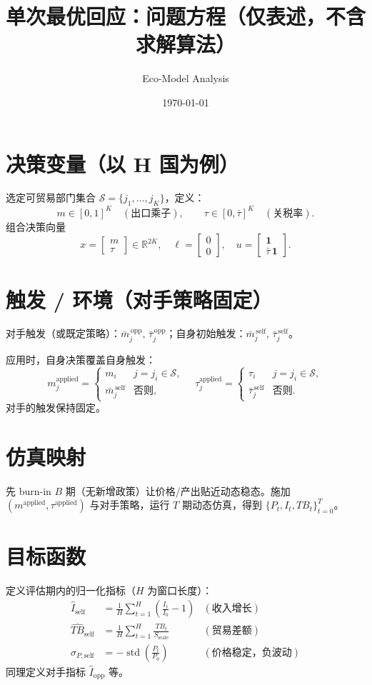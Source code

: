 \documentclass{ctexart}
\title{单次最优回应：问题方程（仅表述，不含求解算法）}
\author{Eco-Model Analysis}
\date{\today}
\begin{document}
\maketitle

\section*{决策变量（以 H 国为例）}
选定可贸易部门集合 $\mathcal{S}=\{j_1,\dots,j_K\}$，定义：
\[
m \in [0,1]^K \quad (\text{出口乘子}), \qquad
\tau \in [0,\bar{\tau}]^K \quad (\text{关税率}).
\]
组合决策向量
\[
x = \begin{bmatrix} m \\ \tau \end{bmatrix} \in \mathbb{R}^{2K},\quad
\ell = \begin{bmatrix} 0 \\ 0 \end{bmatrix},\quad
u = \begin{bmatrix} \mathbf{1} \\ \bar{\tau}\,\mathbf{1} \end{bmatrix}.
\]

\section*{触发 / 环境（对手策略固定）}
对手触发（或既定策略）：$\bar{m}^{\,\text{opp}}_j,\,\bar{\tau}^{\,\text{opp}}_j$；自身初始触发：$\bar{m}^{\,\text{self}}_j,\,\bar{\tau}^{\,\text{self}}_j$。

应用时，自身决策覆盖自身触发：
\[
m^{\text{applied}}_j =
\begin{cases}
m_i & j=j_i\in\mathcal{S},\\
\bar{m}^{\,\text{self}}_j & \text{否则},
\end{cases}
\quad
\tau^{\text{applied}}_j =
\begin{cases}
\tau_i & j=j_i\in\mathcal{S},\\
\bar{\tau}^{\,\text{self}}_j & \text{否则}.
\end{cases}
\]
对手的触发保持固定。

\section*{仿真映射}
先 burn-in $B$ 期（无新增政策）让价格/产出贴近动态稳态。施加 $(m^{\text{applied}}, \tau^{\text{applied}})$ 与对手策略，运行 $T$ 期动态仿真，得到 $\{P_t, I_t, TB_t\}_{t=0}^{T}$。

\section*{目标函数}
定义评估期内的归一化指标（$H$ 为窗口长度）：
\begin{align*}
    \hat{I}_{\text{self}} &= \frac{1}{H}\sum_{t=1}^H \left(\frac{I_t}{I_0} - 1\right) & (\text{收入增长}) \\
    \widehat{TB}_{\text{self}} &= \frac{1}{H}\sum_{t=1}^H \frac{TB_t}{S_{\text{scale}}} & (\text{贸易差额}) \\
    \hat{\sigma}_{P, \text{self}} &= - \operatorname{std}\left(\frac{P_t}{P_0}\right) & (\text{价格稳定，负波动})
\end{align*}
同理定义对手指标 $\hat{I}_{\text{opp}}$ 等。
\end{document}
